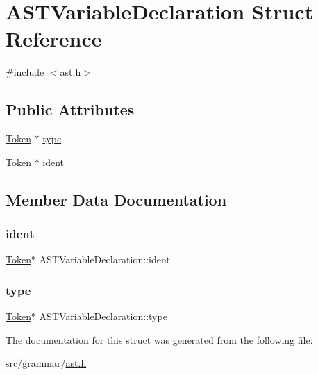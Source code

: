 \hypertarget{structASTVariableDeclaration}{}\section{A\+S\+T\+Variable\+Declaration Struct Reference}
\label{structASTVariableDeclaration}


{\ttfamily \#include $<$ast.\+h$>$}

\subsection*{Public Attributes}
\begin{DoxyCompactItemize}
\item 
\hyperlink{structToken}{Token} $\ast$ \hyperlink{structASTVariableDeclaration_addb07d510fc1ba5a7cd5600f1aed3ea0}{type}
\item 
\hyperlink{structToken}{Token} $\ast$ \hyperlink{structASTVariableDeclaration_a9589e5a9a56d8f3699e2559c45b19c51}{ident}
\end{DoxyCompactItemize}


\subsection{Member Data Documentation}
\hypertarget{structASTVariableDeclaration_a9589e5a9a56d8f3699e2559c45b19c51}{}\label{structASTVariableDeclaration_a9589e5a9a56d8f3699e2559c45b19c51} 
\subsubsection{\texorpdfstring{ident}{ident}}
{\footnotesize\ttfamily \hyperlink{structToken}{Token}$\ast$ A\+S\+T\+Variable\+Declaration\+::ident}

\hypertarget{structASTVariableDeclaration_addb07d510fc1ba5a7cd5600f1aed3ea0}{}\label{structASTVariableDeclaration_addb07d510fc1ba5a7cd5600f1aed3ea0} 
\subsubsection{\texorpdfstring{type}{type}}
{\footnotesize\ttfamily \hyperlink{structToken}{Token}$\ast$ A\+S\+T\+Variable\+Declaration\+::type}



The documentation for this struct was generated from the following file\+:\begin{DoxyCompactItemize}
\item 
src/grammar/\hyperlink{ast_8h}{ast.\+h}\end{DoxyCompactItemize}
